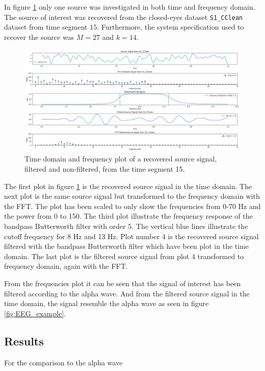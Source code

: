 In figure \ref{fig:dft_1} only one source was investigated in both time and frequency domain. The source of interest was recovered from the closed-eyes dataset \texttt{S1\_CClean} dataset from time segment $15$. Furthermore, the system specification used to recover the source was $M=27$ and $k=14$.
\begin{figure}[H]
\centering
\includegraphics[scale=0.28]{figures/ch_7/DFT_plot_X_timeseg15_source10.png}
\caption{Time domain and frequency plot of a recovered source signal, filtered and non-filtered, from the time segment 15.}
\label{fig:dft_1}
\end{figure}
\noindent
The first plot in figure \ref{fig:dft_1} is the recovered source signal in the time domain. The next plot is the same source signal but transformed to the frequency domain with the FFT. The plot has been scaled to only show the frequencies from 0-70 Hz and the power from 0 to 150. The third plot illustrate the frequency response of the bandpass Butterworth filter with order 5. The vertical blue lines illustrate the cutoff frequency for 8 Hz and 13 Hz.
Plot number 4 is the recovered source signal filtered with the bandpass Butterworth filter which have been plot in the time domain. The last plot is the filtered source signal from plot 4 transformed to frequency domain, again with the FFT.

From the frequencies plot it can be seen that the signal of interest has been filtered according to the alpha wave. And from the filtered source signal in the time domain, the signal resemble the alpha wave as seen in figure \ref{fig:EEG_example}.

\subsection{Results}
For the comparison to the alpha wave


